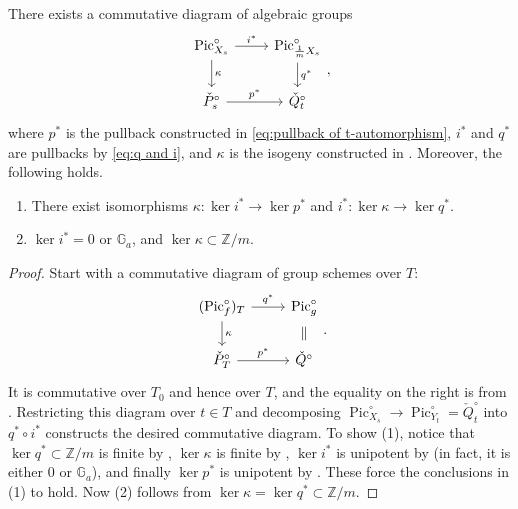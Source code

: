 \documentclass[reqno, letterpaper]{amsart}
\numberwithin{equation}{subsection}
\let\to\longrightarrow
\newcommand{\GG}{\mathbb{G}}
\newcommand{\ZZ}{\mathbb{Z}}
\DeclareMathOperator{\Pic}{Pic}
\begin{document}
			\begin{lemma} \label{lem:kernel of Pic to P check}
				There exists a commutative diagram of algebraic groups
				\[\begin{tikzcd}
					\Pic^\circ_{X_s} \arrow[r, "i^*"] \arrow[d, "\kappa"] & \Pic^\circ_{\frac{1}{m} X_s} \arrow[d, "q^*"] \\
					\check P^\circ_s \arrow[r, "p^*"] & \check Q^\circ_t
				\end{tikzcd},\]
				where $p^*$ is the pullback constructed in \eqref{eq:pullback of t-automorphism}, $i^*$ and $q^*$ are pullbacks by \eqref{eq:q and i}, and $\kappa$ is the isogeny constructed in . Moreover, the following holds.
				\begin{enumerate}
					\item There exist isomorphisms $\kappa : \ker i^* \to \ker p^*$ and $i^* : \ker \kappa \to \ker q^*$.
					\item $\ker i^* = 0$ or $\GG_a$, and $\ker \kappa \subset \ZZ/m$.
				\end{enumerate}
			\end{lemma}
			\begin{proof}
				Start with a commutative diagram of group schemes over $T$:
				\[\begin{tikzcd}
					(\Pic^\circ_f)_T \arrow[r, "q^*"] \arrow[d, "\kappa"] & \Pic^\circ_g \arrow[d, phantom, "\parallel"] \\
					\check P^\circ_T \arrow[r, "p^*"] & \check Q^\circ
				\end{tikzcd}.\]
				It is commutative over $T_0$ and hence over $T$, and the equality on the right is from . Restricting this diagram over $t \in T$ and decomposing $\Pic^\circ_{X_s} \to \Pic^\circ_{Y_t} = \check Q_t^\circ$ into $q^* \circ i^*$ constructs the desired commutative diagram. To show (1), notice that $\ker q^* \subset \ZZ/m$ is finite by , $\ker \kappa$ is finite by , $\ker i^*$ is unipotent by  (in fact, it is either $0$ or $\GG_a$), and finally $\ker p^*$ is unipotent by . These force the conclusions in (1) to hold. Now (2) follows from $\ker \kappa = \ker q^* \subset \ZZ/m$.
			\end{proof}
			
\end{document}
